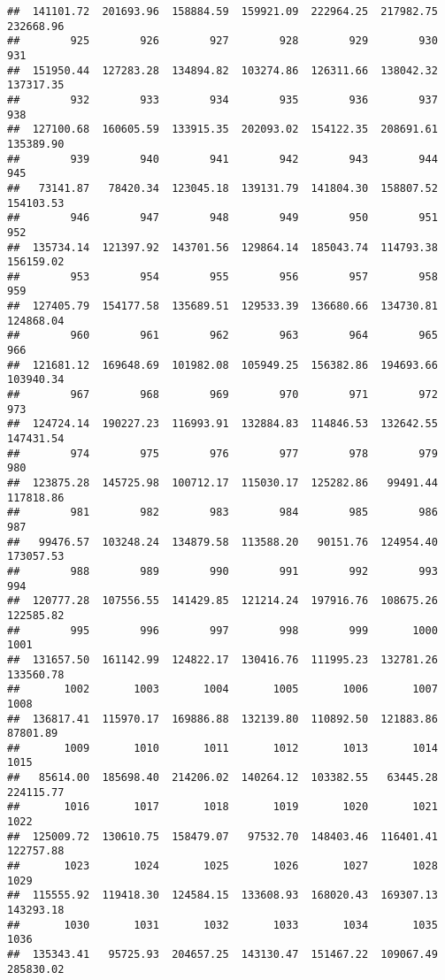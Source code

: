 \documentclass[
]{article}
\begin{document}
\begin{verbatim}
##  141101.72  201693.96  158884.59  159921.09  222964.25  217982.75  232668.96 
##        925        926        927        928        929        930        931 
##  151950.44  127283.28  134894.82  103274.86  126311.66  138042.32  137317.35 
##        932        933        934        935        936        937        938 
##  127100.68  160605.59  133915.35  202093.02  154122.35  208691.61  135389.90 
##        939        940        941        942        943        944        945 
##   73141.87   78420.34  123045.18  139131.79  141804.30  158807.52  154103.53 
##        946        947        948        949        950        951        952 
##  135734.14  121397.92  143701.56  129864.14  185043.74  114793.38  156159.02 
##        953        954        955        956        957        958        959 
##  127405.79  154177.58  135689.51  129533.39  136680.66  134730.81  124868.04 
##        960        961        962        963        964        965        966 
##  121681.12  169648.69  101982.08  105949.25  156382.86  194693.66  103940.34 
##        967        968        969        970        971        972        973 
##  124724.14  190227.23  116993.91  132884.83  114846.53  132642.55  147431.54 
##        974        975        976        977        978        979        980 
##  123875.28  145725.98  100712.17  115030.17  125282.86   99491.44  117818.86 
##        981        982        983        984        985        986        987 
##   99476.57  103248.24  134879.58  113588.20   90151.76  124954.40  173057.53 
##        988        989        990        991        992        993        994 
##  120777.28  107556.55  141429.85  121214.24  197916.76  108675.26  122585.82 
##        995        996        997        998        999       1000       1001 
##  131657.50  161142.99  124822.17  130416.76  111995.23  132781.26  133560.78 
##       1002       1003       1004       1005       1006       1007       1008 
##  136817.41  115970.17  169886.88  132139.80  110892.50  121883.86   87801.89 
##       1009       1010       1011       1012       1013       1014       1015 
##   85614.00  185698.40  214206.02  140264.12  103382.55   63445.28  224115.77 
##       1016       1017       1018       1019       1020       1021       1022 
##  125009.72  130610.75  158479.07   97532.70  148403.46  116401.41  122757.88 
##       1023       1024       1025       1026       1027       1028       1029 
##  115555.92  119418.30  124584.15  133608.93  168020.43  169307.13  143293.18 
##       1030       1031       1032       1033       1034       1035       1036 
##  135343.41   95725.93  204657.25  143130.47  151467.22  109067.49  285830.02 

\end{verbatim}
\end{document}
